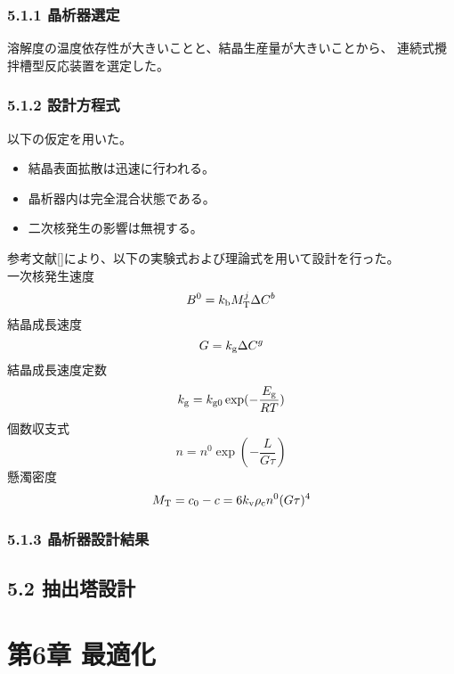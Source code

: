 \documentclass[a4j]{jsarticle}
\begin{document}
\subsection*{5.1.1 晶析器選定}
溶解度の温度依存性が大きいことと、結晶生産量が大きいことから、
連続式攪拌槽型反応装置を選定した。
\subsection*{5.1.2 設計方程式}
以下の仮定を用いた。
\begin{itemize} 
    \item 結晶表面拡散は迅速に行われる。\\
    \item 晶析器内は完全混合状態である。\\
    \item 二次核発生の影響は無視する。\\
\end{itemize}

参考文献[]により、以下の実験式および理論式を用いて設計を行った。\\
一次核発生速度
\begin{equation}
    B^0 = k_{{\rm b}}M_{{\rm T}}^j \Delta C^b
\end{equation}
結晶成長速度
\begin{equation}
    G = k_{{\rm g}}\Delta C^g
\end{equation}
結晶成長速度定数
\begin{equation}
    k_{{\rm g}} = k_{{\rm g0}} \exp(-\frac{E_{{\rm g}}}{RT})
\end{equation}
個数収支式
\begin{equation}
    n=n^0 \exp(-\frac{L}{G\tau})
\end{equation}
懸濁密度
\begin{equation}
    M_{{\rm T}} = c_0-c = 6k_{{\rm v}}\rho_{{\rm c}}n^0(G\tau)^4
\end{equation}

\subsection*{5.1.3 晶析器設計結果}


\section*{5.2 抽出塔設計}

\chapter*{第6章 最適化}
\end{document}
